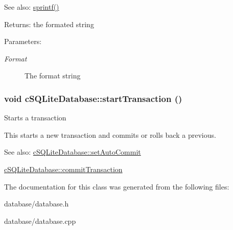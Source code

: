 \begin{Desc}
\item[See also:]\hyperlink{classcSQLiteDatabase_cdc42326657aea81fd26da6500642381}{sprintf()} \end{Desc}
\begin{Desc}
\item[Returns:]the formated string \end{Desc}
\begin{Desc}
\item[Parameters:]
\begin{description}
\item[{\em Format}]The format string \end{description}
\end{Desc}
\hypertarget{classcSQLiteDatabase_5c481c06d73cff4f1192409bfc23a15a}{
\subsubsection[{startTransaction}]{\setlength{\rightskip}{0pt plus 5cm}void cSQLiteDatabase::startTransaction ()}}
\label{classcSQLiteDatabase_5c481c06d73cff4f1192409bfc23a15a}


Starts a transaction

This starts a new transaction and commits or rolls back a previous.

\begin{Desc}
\item[See also:]\hyperlink{classcSQLiteDatabase_b1749baadeb733ea3efdbbd9ffe83253}{cSQLiteDatabase::setAutoCommit} 

\hyperlink{classcSQLiteDatabase_f11b7090ae824f7f3fc094dc7112323a}{cSQLiteDatabase::commitTransaction} \end{Desc}


The documentation for this class was generated from the following files:\begin{CompactItemize}
\item 
database/database.h\item 
database/database.cpp\end{CompactItemize}
